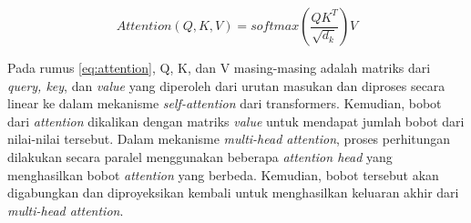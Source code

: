 \begin{equation}
    Attention(Q, K, V) = softmax(\frac{QK^{T}}{\sqrt{d_k}})V
    \label{eq:attention}
\end{equation}

Pada rumus \ref{eq:attention}, Q, K, dan V masing-masing adalah matriks dari \textit{query, key}, dan \textit{value} yang diperoleh dari urutan masukan dan diproses secara linear ke dalam mekanisme \textit{self-attention} dari transformers. Kemudian, bobot dari \textit{attention} dikalikan dengan matriks \textit{value} untuk mendapat jumlah bobot dari nilai-nilai tersebut. Dalam mekanisme \textit{multi-head attention}, proses perhitungan dilakukan secara paralel menggunakan beberapa \textit{attention head} yang menghasilkan bobot \textit{attention} yang berbeda. Kemudian, bobot tersebut akan digabungkan dan diproyeksikan kembali untuk menghasilkan keluaran akhir dari \textit{multi-head attention}.
